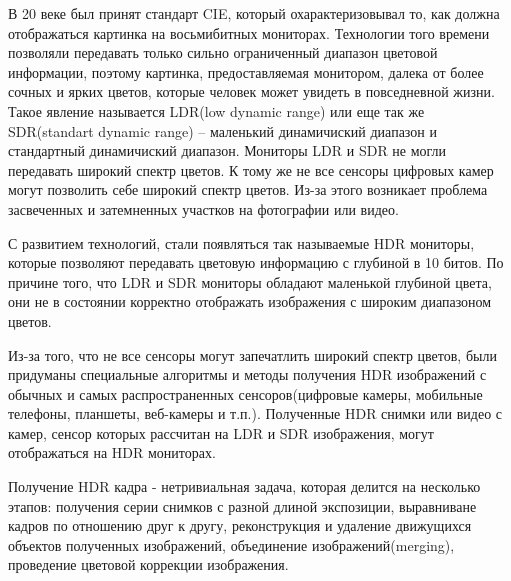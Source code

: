 \Introduction

В 20 веке был принят стандарт CIE, который охарактеризовывал то, как должна отображаться картинка на восьмибитных мониторах. Технологии того времени позволяли передавать только сильно ограниченный диапазон цветовой информации, поэтому картинка, предоставляемая монитором, далека от более сочных и ярких цветов, которые человек может увидеть в повседневной жизни. Такое явление называется LDR(low dynamic range) или еще так же SDR(standart dynamic range) -- маленький динамичиский диапазон и стандартный динамичиский диапазон. Мониторы LDR и SDR не могли передавать широкий спектр цветов. К тому же не все сенсоры цифровых камер могут позволить себе широкий спектр цветов. Из-за этого возникает проблема засвеченных и затемненных участков на фотографии или видео.

С развитием технологий, стали появляться так называемые HDR мониторы, которые позволяют передавать цветовую информацию с глубиной в 10 битов. По причине того, что LDR и SDR мониторы обладают маленькой глубиной цвета, они не в состоянии корректно отображать изображения с широким диапазоном цветов.

Из-за того, что не все сенсоры могут запечатлить широкий спектр цветов, были придуманы специальные алгоритмы и методы получения HDR изображений с обычных и самых распространенных сенсоров(цифровые камеры, мобильные телефоны, планшеты, веб-камеры и т.п.). Полученные HDR снимки или видео с камер, сенсор которых рассчитан на LDR и SDR изображения, могут отображаться на HDR мониторах.

Получение HDR кадра - нетривиальная задача, которая делится на несколько этапов: получения серии снимков с разной длиной экспозиции, выравниване кадров по отношению друг к другу, реконструкция и удаление движущихся объектов полученных изображений, объединение изображений(merging), проведение цветовой коррекции изображения.
